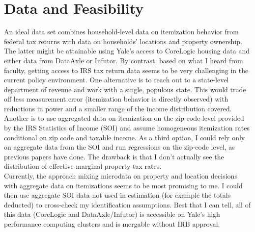 \documentclass[fleqn,10pt]{olplainarticle}
\begin{document}
\section*{Data and Feasibility}
An ideal data set combines household-level data on itemization behavior from federal tax returns with data on households' locations and property ownership. The latter might be attainable using Yale's access to CoreLogic housing data and either data from DataAxle or Infutor. By contrast, based on what I heard from faculty, getting access to IRS tax return data seems to be very challenging in the current policy environment. One alternative is to reach out to a state-level department of revenue and work with a single, populous state. This would trade off less measurement error (itemization behavior is directly observed) with reductions in power and a smaller range of the income distribution covered. Another is to use aggregated data on itemization on the zip-code level provided by the IRS Statistics of Income (SOI) and assume homogeneous itemization rates conditional on zip code and taxable income. As a third option, I could rely only on aggregate data from the SOI and run regressions on the zip-code level, as previous papers have done. The drawback is that I don't actually see the distribution of effective marginal property tax rates.\\
Currently, the approach mixing microdata on property and location decisions with aggregate data on itemizations seems to be most promising to me. I could then use aggregate SOI data not used in estimation (for example the totals deducted) to cross-check my identification assumptions. Best that I can tell, all of this data (CoreLogic and DataAxle/Infutor) is accessible on Yale's high performance computing clusters and is mergable without IRB approval.\\
\end{document}
